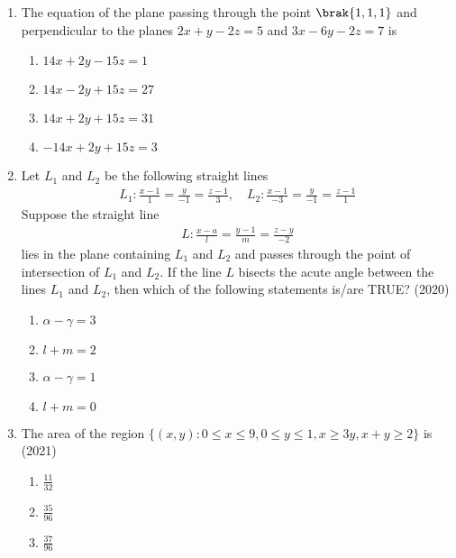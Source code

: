 \begin{enumerate}[label=\thesubsection.\arabic*.,ref=\thesubsection.\theenumi]
         \item %
		 The equation of the plane passing through the point $\brak{1,1,1}$ and perpendicular to the planes $2x+y-2z=5$ and $3x-6y-2z=7$ is \hfill{}
\begin{multicols}{2}
\begin{enumerate}
        \item $14x+2y-15z=1$                             
        \item $14x-2y+15z=27$                           
        \item $14x+2y+15z=31$            
        \item $-14x+2y+15z=3$
\end{enumerate}
\end{multicols}
\item   Let $L_1$ and $L_2$ be the following straight lines
\begin{align}
	L_1 :\frac{x - 1}{1} = \frac{y}{-1} = \frac{z - 1}{3}, \quad 
	L_2 : \frac{x - 1}{-3} = \frac{y}{-1} = \frac{z - 1}{1}
\end{align}
    Suppose the straight line 
\begin{align}
    L :  \frac{x - a}{l} = \frac{y - 1}{m} = \frac{z - y}{-2}
\end{align}
    lies in the plane containing $L_1$ and $L_2$ and passes through the point of intersection of $L_1$ and $L_2$. If the line $L$ bisects the acute angle between the lines $L_1$ and $L_2$, then which of the following statements is/are TRUE?
		\hfill (2020)
\begin{multicols}{2}
    \begin{enumerate}
        \item  $\alpha - \gamma = 3$
        \item  $l + m = 2$
        \item  $\alpha - \gamma = 1$
        \item  $l + m = 0$
    \end{enumerate}
\end{multicols}
%
 \item The area of the region $\{(x, y): 0 \leq x \leq 9, 0 \leq y \leq 1, x \geq 3y, x + y \geq 2\}$ is
    \hfill (2021) 
 \begin{multicols}{4}
\begin{enumerate} 
	 \item  $\frac{11}{32}$  
        \item  $\frac{35}{96}$  
        \item  $\frac{37}{96}$  

\end{enumerate}
\end{multicols}
\end{enumerate}
